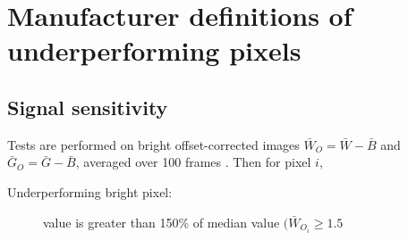 \documentclass[\main/IO-Pixels.tex]{subfiles}
\begin{document}
\section{Manufacturer definitions of underperforming pixels}
\label{app:bpx-defn}


\subsection{Signal sensitivity}
Tests are performed on bright offset-corrected images $\bar{W}_O = \bar{W} - \bar{B}$ and $\bar{G}_O = \bar{G} - \bar{B}$, averaged over 100 frames . Then for pixel $i$, 

\begin{description}
\item[Underperforming bright pixel: ] value is greater than 150\% of median value $(\bar{W}_{O_i} \ge 1.5 $
\end{description}
\end{document}
